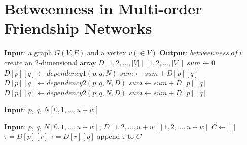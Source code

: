 \documentclass[preprint,12pt,authoryear]{elsarticle}
\theoremstyle{definition}
\begin{document}
\section{Betweenness in Multi-order Friendship Networks}\label{sec:betweenness}

\begin{algorithm}[t]
\label{alg:main}
\begin{algorithmic}[1]
\State $\mathbf{Input}$: a graph $G(V,E)$ and a vertex $v (\in V)$
\State $\mathbf{Output}$: $betweenness\ of\ {v}$
\State create an $2$-dimensional array $D[1,2,...,|V|][1,2,...,|V|]$ 
\State $sum \gets 0$
		\State $D[p][q] \gets dependency1(p, q, N)$
		\State $sum \gets sum + D[p][q]$
	\EndFor
		\State $D[p][q] \gets dependency2(p, q, N, D)$
		\State $sum \gets sum + D[p][q]$
	\EndFor
\EndFor
{} 
		\State $D[p][q] \gets dependency2(p, q, N, D)$
		\State $sum \gets sum + D[p][q]$
	\EndFor
\EndFor
\State {} 
\caption{$nodal\_betweenness(G(V,E), v)$}\label{alg:main}

\end{algorithmic}
\end{algorithm}
\begin{algorithm}[t]
\begin{algorithmic}[1]
\State $\mathbf{Input}$: $p$, $q$, $N[0,1,...,u+w]$
	\State {} 
\Else
	\State {} 
\EndIf
\caption{$dependency1(p, q, N)$}
\label{alg:dependency1}
\end{algorithmic}
\end{algorithm}
\begin{algorithm}[t]
\begin{algorithmic}[1]
\State $\mathbf{Input}$: $p$, $q$, $N[0,1,...,u+w]$, $D[1,2,...,u+w][1,2,...,u+w]$
\State $C \gets []$\;
		\State $\tau = D[p][r]$
	\Else 
		\State $\tau = D[r][p]$
	\EndIf
		\State {} 
	\Else 
		\State append $\tau$ to $C$
	\EndIf
\EndFor
\State {}    
\caption{$dependency2(p, q, N, D)$}
\label{alg:dependency2}
\end{algorithmic}
\end{algorithm}
\end{document}
